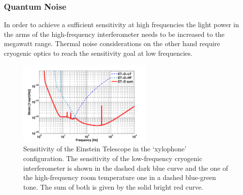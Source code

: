 \subsubsection{Quantum Noise} 
In order to achieve a sufficient sensitivity at high frequencies the light power in 
the arms of the high-frequency interferometer needs to be increased to the 
megawatt range. Thermal noise considerations on the other hand require cryogenic 
optics to reach the sensitivity goal at low frequencies. 

\begin{figure}
	\centering
		\includegraphics[width=0.6\textwidth]{Sec_Introduction/ET_D_spectrum.pdf}
	\caption{Sensitivity of the Einstein Telescope in the `xylophone' configuration. 
	The sensitivity of the low-frequency cryogenic interferometer is shown in the 
	dashed dark blue curve and the one of the high-frequency room temperature 
	one in a dashed blue-green tone. The sum of both is given by the solid bright red curve.}
	\label{fig:ET_sensitivity}
\end{figure}

